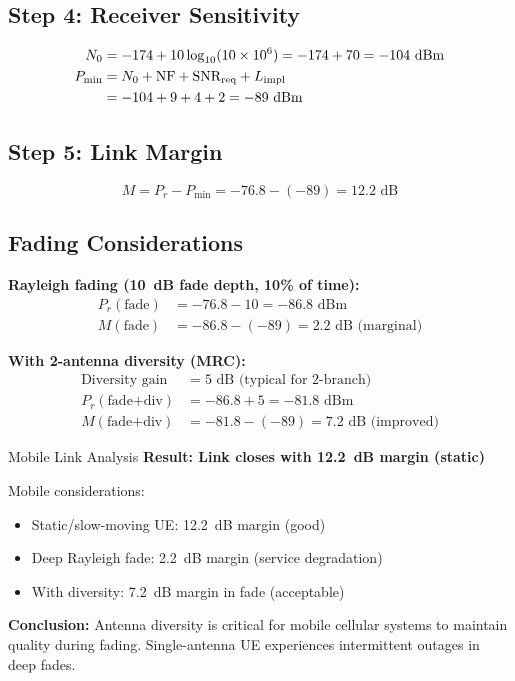\subsection*{Step 4: Receiver Sensitivity}

\begin{align}
N_0 &= -174 + 10\log_{10}(10 \times 10^6) = -174 + 70 = -104\text{~dBm} \notag \\
P_{\text{min}} &= N_0 + \text{NF} + \text{SNR}_{\text{req}} + L_{\text{impl}} \notag \\
&= -104 + 9 + 4 + 2 = -89\text{~dBm}
\label{eq:ex3-sensitivity}
\end{align}

\subsection*{Step 5: Link Margin}

\begin{equation}
M = P_r - P_{\text{min}} = -76.8 - (-89) = 12.2\text{~dB}
\label{eq:ex3-margin}
\end{equation}

\subsection*{Fading Considerations}

\textbf{Rayleigh fading (10~dB fade depth, 10\% of time):}
\begin{align*}
P_r(\text{fade}) &= -76.8 - 10 = -86.8\text{~dBm} \\
M(\text{fade}) &= -86.8 - (-89) = 2.2\text{~dB (marginal)}
\end{align*}

\textbf{With 2-antenna diversity (MRC):}
\begin{align*}
\text{Diversity gain} &= 5\text{~dB (typical for 2-branch)} \\
P_r(\text{fade+div}) &= -86.8 + 5 = -81.8\text{~dBm} \\
M(\text{fade+div}) &= -81.8 - (-89) = 7.2\text{~dB (improved)}
\end{align*}

\begin{calloutbox}[colback=black!8!white,colframe=black]{Mobile Link Analysis}
\textbf{Result: Link closes with 12.2~dB margin (static)}

Mobile considerations:
\begin{itemize}
\item Static/slow-moving UE: 12.2~dB margin (good)
\item Deep Rayleigh fade: 2.2~dB margin (service degradation)
\item With diversity: 7.2~dB margin in fade (acceptable)
\end{itemize}

\textbf{Conclusion:} Antenna diversity is critical for mobile cellular systems to maintain quality during fading. Single-antenna UE experiences intermittent outages in deep fades.
\end{calloutbox}

